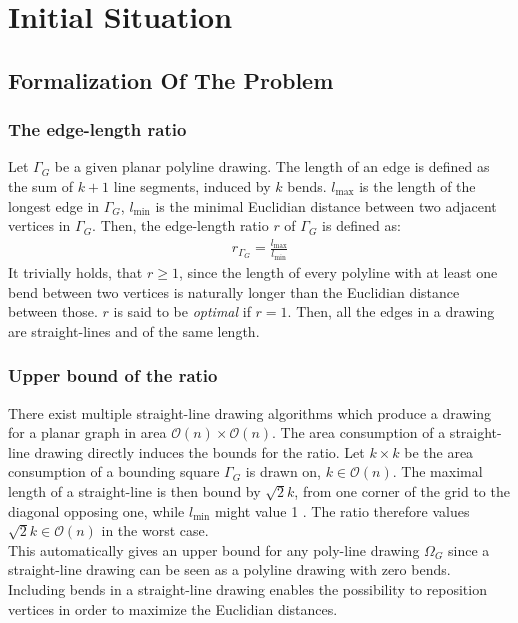 \section{Initial Situation}

\subsection{Formalization Of The Problem}
\subsubsection{The edge-length ratio}
Let $\Gamma_G$ be a given planar polyline drawing. The length of an edge is defined as the sum of $k+1$ line segments, induced by $k$ bends. $l_{\max}$ is the length of the longest edge in $\Gamma_G$, $l_{\min}$ is the minimal Euclidian distance between two adjacent vertices in $\Gamma_G$. Then, the edge-length ratio $r$ of $\Gamma_G$ is defined as:
\begin{align}
	r_{\Gamma_G} = \frac{l_{\max}}{l_{\min}} 
\end{align}
It trivially holds, that $r\geq1$, since the length of every polyline with at least one bend between two vertices is naturally longer than the Euclidian distance between those. $r$ is said to be \emph{optimal }if $r=1$. Then, all the edges in a drawing are straight-lines and of the same length.
\subsubsection{Upper bound of the ratio}
There exist multiple straight-line drawing algorithms which produce a drawing for a planar graph in area $\mathcal{O}(n)\times\mathcal{O}(n)$.
The area consumption of a straight-line drawing directly induces the bounds for the ratio. Let $k\times k$ be the area consumption of a bounding square $\Gamma_G$ is drawn on, $k\in \mathcal{O}(n)$. The maximal length of a straight-line is then bound by $\sqrt{2}k$, from one corner of the grid to the diagonal opposing one, while $l_{\min}$ might value 1 \UL. The ratio therefore values $\sqrt{2}k \in \mathcal{O}(n)$ in the worst case.\\
This automatically gives an upper bound for any poly-line drawing $\Omega_G$ since a straight-line drawing can be seen as a polyline drawing with zero bends. Including bends in a straight-line drawing enables the possibility to reposition vertices in order to maximize the Euclidian distances.

